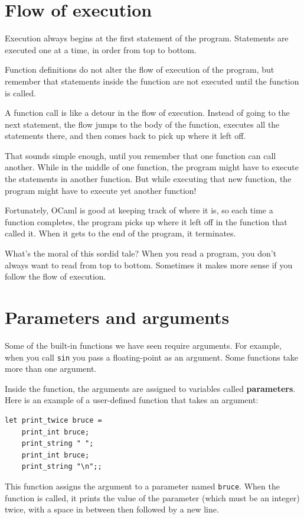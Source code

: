 \documentclass[10pt]{book}
\begin{document}
\section{Flow of execution}

Execution always begins at the first statement of the program.
Statements are executed one at a time, in order from top to bottom.

Function definitions do not alter the flow of execution of the
program, but remember that statements inside the function are not
executed until the function is called.

A function call is like a detour in the flow of execution. Instead of
going to the next statement, the flow jumps to the body of
the function, executes all the statements there, and then comes back
to pick up where it left off.

That sounds simple enough, until you remember that one function can
call another.  While in the middle of one function, the program might
have to execute the statements in another function. But while
executing that new function, the program might have to execute yet
another function!

Fortunately, OCaml is good at keeping track of where it is, so each
time a function completes, the program picks up where it left off in
the function that called it.  When it gets to the end of the program,
it terminates.

What's the moral of this sordid tale?  When you read a program, you
don't always want to read from top to bottom.  Sometimes it makes
more sense if you follow the flow of execution.


\section{Parameters and arguments}
\label{parameters}

Some of the built-in functions we have seen require arguments.  For
example, when you call {\tt sin} you pass a floating-point
as an argument.  Some functions take more than one argument.

Inside the function, the arguments are assigned to
variables called {\bf parameters}.  Here is an example of a
user-defined function that takes an argument:


\beforeverb
\begin{verbatim}
let print_twice bruce =
	print_int bruce;
	print_string " ";
	print_int bruce;
	print_string "\n";;
\end{verbatim}
\afterverb
%
This function assigns the argument to a parameter
named {\tt bruce}.  When the function is called, it prints the value of
the parameter (which must be an integer) twice, with a space in between then
followed by a new line.
\end{document}
